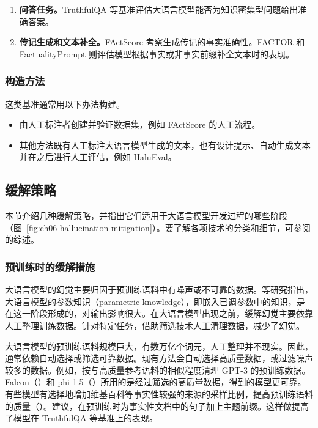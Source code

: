 \begin{enumerate}
\item \textbf{问答任务。}TruthfulQA 等基准评估大语言模型能否为知识密集型问题给出准确答案。
\item \textbf{传记生成和文本补全。}FActScore 考察生成传记的事实准确性。FACTOR 和 FactualityPrompt 则评估模型根据事实或非事实前缀补全文本时的表现。
\end{enumerate}

\subsubsection{构造方法}
这类基准通常用以下办法构建。

\begin{itemize}
\item 由人工标注者创建并验证数据集，例如 FActScore 的人工流程。
\item 其他方法既有人工标注大语言模型生成的文本，也有设计提示、自动生成文本并在之后进行人工评估，例如 HaluEval。
\end{itemize}

\subsection{缓解策略}
本节介绍几种缓解策略，并指出它们适用于大语言模型开发过程的哪些阶段（图~\ref{fig:ch06-hallucination-mitigation}）。要了解各项技术的分类和细节，可参阅 的综述。

\subsubsection{预训练时的缓解措施}
大语言模型的幻觉主要归因于预训练语料中有噪声或不可靠的数据。等研究指出，大语言模型的参数知识（parametric knowledge），即嵌入已调参数中的知识，是在这一阶段形成的，对输出影响很大。在大语言模型出现之前，缓解幻觉主要依靠人工整理训练数据。针对特定任务，借助筛选技术人工清理数据，减少了幻觉。

\begin{practicaltip}
大语言模型的预训练语料规模巨大，有数万亿个词元，人工整理并不现实。因此，通常依赖自动选择或筛选可靠数据。现有方法会自动选择高质量数据，或过滤噪声较多的数据。例如，按与高质量参考语料的相似程度清理 GPT-3 的预训练数据。Falcon（）和 phi-1.5（）所用的是经过筛选的高质量数据，得到的模型更可靠。有些模型有选择地增加维基百科等事实性较强的来源的采样比例，提高预训练语料的质量（）。建议，在预训练时为事实性文档中的句子加上主题前缀。这样做提高了模型在 TruthfulQA 等基准上的表现。
\end{practicaltip}

